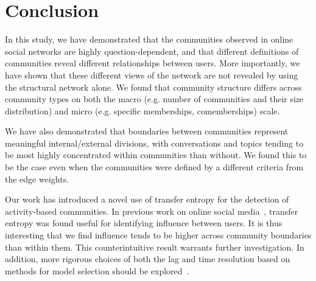 \section{Conclusion}


In this study, we have demonstrated that the communities observed in online social networks are highly question-dependent, and that different definitions of communities reveal different relationships between users. More importantly, we have shown that these different views of the network are not revealed by using the structural network alone. We found that community structure differs across community types on both the macro (e.g. number of communities and their size distribution) and micro (e.g. specific memberships, comemberships) scale.

We have also demonstrated that boundaries between communities represent meaningful internal/external divisions, with conversations and topics tending to be most highly concentrated within communities than without. We found this to be the case even when the communities were defined by a different criteria from the edge weights.







Our work has introduced a novel use of transfer entropy for the detection of activity-based communities. In previous work on online social media~\cite{ver2012information}, transfer entropy was found useful for identifying influence between users. It is thus interesting that we find influence tends to be higher across community boundaries than within them. This counterintuitive result warrants further investigation. In addition, more rigorous choices of both the lag and time resolution based on methods for model selection should be explored~\cite{claeskens2008model}.

